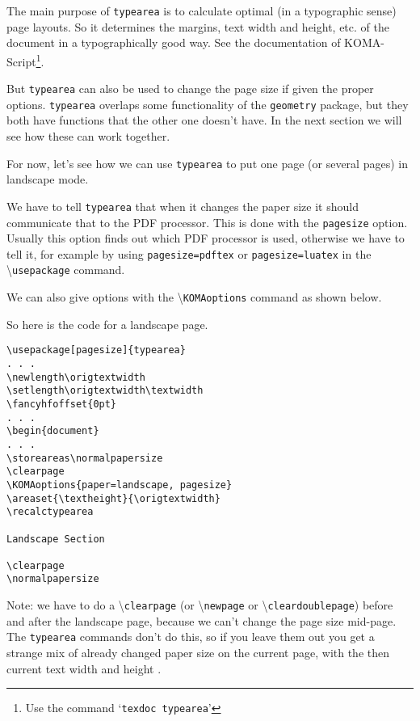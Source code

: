 \documentclass[twoside]{article}
\newcommand\cs[1]{\textbackslash\texttt{#1}}
\begin{document}
The main purpose of \texttt{typearea} is to calculate optimal (in a typographic sense) page layouts. So it determines the margins, text width and height, etc. of the document in a typographically good way. See the documentation of KOMA-Script\footnote{Use the command `\texttt{texdoc typearea}'}.

But \texttt{typearea} can also be used to change the page size if given the proper options. \texttt{typearea} overlaps some functionality of the \texttt{geometry} package, but they both have functions that the other one doesn't have. In the next section we will see how these can work together.

For now, let's see how we can use \texttt{typearea} to put one page (or several pages) in landscape mode.

We have to tell \texttt{typearea} that when it changes the paper size it should communicate that to the PDF processor. This is done with the \texttt{pagesize} option. Usually this option finds out which PDF processor is used, otherwise we have to tell it, for example by using \texttt{pagesize=pdftex} or \texttt{pagesize=luatex} in the \cs{usepackage} command.

We can also give options with the \cs{KOMAoptions} command as shown below.

So here is the code for a landscape page.

\noindent
\begin{boxedminipage}{\textwidth}
\begin{verbatim}
\usepackage[pagesize]{typearea}
. . .
\newlength\origtextwidth
\setlength\origtextwidth\textwidth
\fancyhfoffset{0pt}
. . .
\begin{document}
. . .
\storeareas\normalpapersize
\clearpage
\KOMAoptions{paper=landscape, pagesize}
\areaset{\textheight}{\origtextwidth}
\recalctypearea

Landscape Section

\clearpage
\normalpapersize
\end{verbatim}
\end{boxedminipage}

\medskip

Note: we have to do a \cs{clearpage} (or  \cs{newpage} or  \cs{cleardoublepage}) before and after the landscape page, because we can't change the page size mid-page. The \texttt{typearea} commands don't do this, so if you leave them out you get a strange mix of already changed paper size on the current page, with the then current text width and height .
\end{document}
